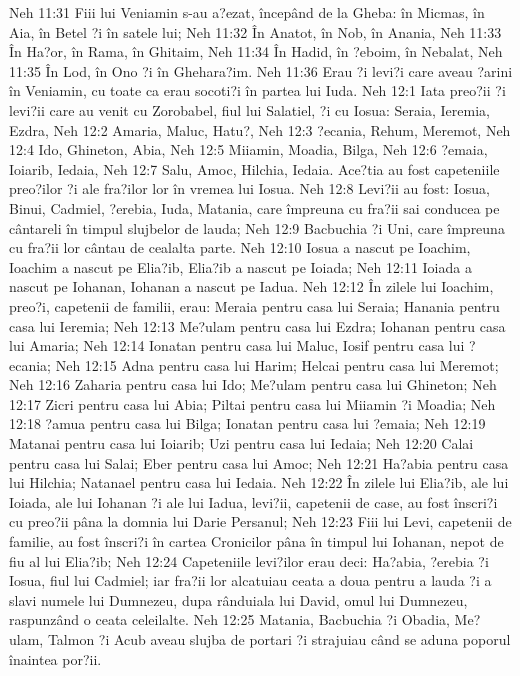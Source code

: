 Neh 11:31  Fiii lui Veniamin s-au a?ezat, începând de la Gheba: în Micmas, în Aia, în Betel ?i în satele lui;
Neh 11:32  În Anatot, în Nob, în Anania,
Neh 11:33  În Ha?or, în Rama, în Ghitaim,
Neh 11:34  În Hadid, în ?eboim, în Nebalat,
Neh 11:35  În Lod, în Ono ?i în Ghehara?im.
Neh 11:36  Erau ?i levi?i care aveau ?arini în Veniamin, cu toate ca erau socoti?i în partea lui Iuda.
Neh 12:1  Iata preo?ii ?i levi?ii care au venit cu Zorobabel, fiul lui Salatiel, ?i cu Iosua: Seraia, Ieremia, Ezdra,
Neh 12:2  Amaria, Maluc, Hatu?,
Neh 12:3  ?ecania, Rehum, Meremot,
Neh 12:4  Ido, Ghineton, Abia,
Neh 12:5  Miiamin, Moadia, Bilga,
Neh 12:6  ?emaia, Ioiarib, Iedaia,
Neh 12:7  Salu, Amoc, Hilchia, Iedaia. Ace?tia au fost capeteniile preo?ilor ?i ale fra?ilor lor în vremea lui Iosua.
Neh 12:8  Levi?ii au fost: Iosua, Binui, Cadmiel, ?erebia, Iuda, Matania, care împreuna cu fra?ii sai conducea pe cântareli în timpul slujbelor de lauda;
Neh 12:9  Bacbuchia ?i Uni, care împreuna cu fra?ii lor cântau de cealalta parte.
Neh 12:10  Iosua a nascut pe Ioachim, Ioachim a nascut pe Elia?ib, Elia?ib a nascut pe Ioiada;
Neh 12:11  Ioiada a nascut pe Iohanan, Iohanan a nascut pe Iadua.
Neh 12:12  În zilele lui Ioachim, preo?i, capetenii de familii, erau: Meraia pentru casa lui Seraia; Hanania pentru casa lui Ieremia;
Neh 12:13  Me?ulam pentru casa lui Ezdra; Iohanan pentru casa lui Amaria;
Neh 12:14  Ionatan pentru casa lui Maluc, Iosif pentru casa lui ?ecania;
Neh 12:15  Adna pentru casa lui Harim; Helcai pentru casa lui Meremot;
Neh 12:16  Zaharia pentru casa lui Ido; Me?ulam pentru casa lui Ghineton;
Neh 12:17  Zicri pentru casa lui Abia; Piltai pentru casa lui Miiamin ?i Moadia;
Neh 12:18  ?amua pentru casa lui Bilga; Ionatan pentru casa lui ?emaia;
Neh 12:19  Matanai pentru casa lui Ioiarib; Uzi pentru casa lui Iedaia;
Neh 12:20  Calai pentru casa lui Salai; Eber pentru casa lui Amoc;
Neh 12:21  Ha?abia pentru casa lui Hilchia; Natanael pentru casa lui Iedaia.
Neh 12:22  În zilele lui Elia?ib, ale lui Ioiada, ale lui Iohanan ?i ale lui Iadua, levi?ii, capetenii de case, au fost înscri?i cu preo?ii pâna la domnia lui Darie Persanul;
Neh 12:23  Fiii lui Levi, capetenii de familie, au fost înscri?i în cartea Cronicilor pâna în timpul lui Iohanan, nepot de fiu al lui Elia?ib;
Neh 12:24  Capeteniile levi?ilor erau deci: Ha?abia, ?erebia ?i Iosua, fiul lui Cadmiel; iar fra?ii lor alcatuiau ceata a doua pentru a lauda ?i a slavi numele lui Dumnezeu, dupa rânduiala lui David, omul lui Dumnezeu, raspunzând o ceata celeilalte.
Neh 12:25  Matania, Bacbuchia ?i Obadia, Me?ulam, Talmon ?i Acub aveau slujba de portari ?i strajuiau când se aduna poporul înaintea por?ii.

